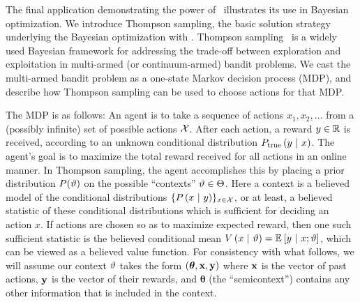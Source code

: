 The final application demonstrating the power of \gpmem\ illustrates its use in Bayesian optimization. We introduce Thompson sampling, the basic solution strategy
underlying the Bayesian optimization with \gpmem.
Thompson sampling~\cite{thompson1933likelihood} is a widely used Bayesian
framework for addressing the trade-off between exploration and exploitation in
multi-armed (or continuum-armed) bandit problems.  
We cast the multi-armed bandit problem as a one-state Markov
decision process (MDP), and describe how Thompson sampling can be used to choose
actions for that MDP.

The MDP is as follows: An agent is to take a sequence of actions $x_1, x_2,
\ldots$ from a (possibly infinite) set of possible actions $\mathcal{X}$.  After each
action, a reward $y \in \mathbb{R}$ is received, according to an unknown conditional
distribution $P_{\textrm{true}}\left( y \ \middle\vert\  x \right)$.  The agent's goal is to maximize the
total reward received for all actions in an online manner.  In Thompson
sampling, the agent accomplishes this by placing a prior distribution
$P(\vartheta)$ on the possible ``contexts'' $\vartheta \in \Theta$.  Here a context
is a believed model of the conditional distributions $\{P\left( x \ \middle\vert\  y \right)\}_{x
\in \mathcal{X}}$, or at least, a believed statistic of these conditional
distributions which is sufficient for deciding an action $x$.  If actions are
chosen so as to maximize expected reward, then one such sufficient statistic is
the believed conditional mean $V \left( x \ \middle\vert\  \vartheta \right) = \mathbb{E}_{}\left[ y \ \middle\vert\ 
x;\vartheta \right]$, which can be viewed as a believed value function.  For
consistency with what follows, we will assume our context $\vartheta$ takes the
form $(\bm{\theta}, \mathbf{x}, \mathbf{y})$ where $\mathbf{x}$ is the vector of past
actions, $\mathbf{y}$ is the vector of their rewards, and $\bm{\theta}$ (the
``semicontext'') contains any other information that is included in the context.

